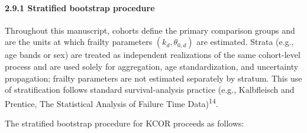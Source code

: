 \documentclass[
]{article}
\begin{document}
\paragraph{2.9.1 Stratified bootstrap
procedure}\label{stratified-bootstrap-procedure}

Throughout this manuscript, cohorts define the primary comparison groups
and are the units at which frailty parameters \((k_d, \theta_{0,d})\)
are estimated. Strata (e.g., age bands or sex) are treated as
independent realizations of the same cohort-level process and are used
solely for aggregation, age standardization, and uncertainty
propagation; frailty parameters are not estimated separately by stratum.
This use of stratification follows standard survival-analysis practice
(e.g., Kalbfleisch and Prentice, The Statistical Analysis of Failure
Time Data)\textsuperscript{14}.

The stratified bootstrap procedure for KCOR proceeds as follows:
\end{document}
